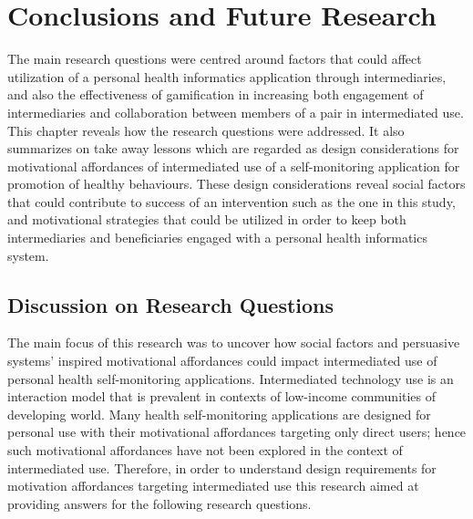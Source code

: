 
\chapter{Conclusions and Future Research} %

\label{discussionchapter} %


The main research questions were centred around factors that could affect utilization of a personal health informatics application through intermediaries, and also the effectiveness of gamification in increasing both engagement of intermediaries and collaboration between members of a pair in intermediated use. This chapter reveals how the research questions were addressed. It also summarizes on take away lessons which  are regarded as design considerations for motivational affordances of intermediated use of a self-monitoring application for promotion of healthy behaviours. These design considerations reveal social factors that could contribute to success of an intervention such as the one in this study, and motivational strategies that could be utilized in order to keep both intermediaries and beneficiaries engaged with a personal health informatics system.

\section{Discussion on Research Questions}
The main focus of this research was to uncover how social factors and persuasive systems' inspired motivational affordances could impact intermediated use of personal health self-monitoring applications. Intermediated technology use is an interaction model that is prevalent in contexts of low-income communities of developing world. Many health self-monitoring applications are designed for personal use with their motivational affordances targeting only direct users; hence such motivational affordances have not been explored in the context of intermediated use. Therefore, in order to understand design requirements for motivation affordances targeting intermediated use this research aimed at providing answers for the following research questions.

